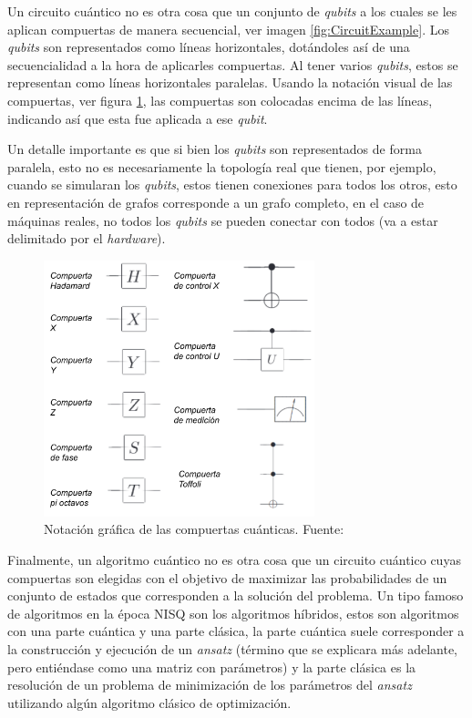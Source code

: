 Un circuito cuántico no es otra cosa que un conjunto de \textit{qubits} a los cuales se les aplican compuertas de manera secuencial, ver imagen \ref{fig:CircuitExample}. Los \textit{qubits} son representados como líneas horizontales, dotándoles así de una secuencialidad a la hora de aplicarles compuertas. Al tener varios \textit{qubits}, estos se representan como líneas horizontales paralelas. Usando la notación visual de las compuertas, ver figura \ref{fig:GatesGraphical}, las compuertas son colocadas encima de las líneas, indicando así que esta fue aplicada a ese \textit{qubit}.

Un detalle importante es que si bien los \textit{qubits} son representados de forma paralela, esto no es necesariamente la topología real que tienen, por ejemplo, cuando se simularan los \textit{qubits}, estos tienen conexiones para todos los otros, esto en representación de grafos corresponde a un grafo completo, en el caso de máquinas reales, no todos los \textit{qubits} se pueden conectar con todos (va a estar delimitado por el \textit{hardware}).

\begin{figure}[H]
\centering
\includegraphics[width=0.7\textwidth]{figures/S2/COMPUERTASVISUAL.png}
\caption{\label{fig:GatesGraphical} Notación gráfica de las compuertas cuánticas. Fuente: \cite{nielsen_chuang_2010}}
\end{figure}

Finalmente, un algoritmo cuántico no es otra cosa que un circuito cuántico cuyas compuertas son elegidas con el objetivo de maximizar las probabilidades de un conjunto de estados que corresponden a la solución del problema. Un tipo famoso de algoritmos en la época NISQ son los algoritmos híbridos, estos son algoritmos con una parte cuántica y una parte clásica, la parte cuántica suele corresponder a la construcción y ejecución de un \textit{ansatz} (término que se explicara más adelante, pero entiéndase como una matriz con parámetros) y la parte clásica es la resolución de un problema de minimización de los parámetros del \textit{ansatz} utilizando algún algoritmo clásico de optimización.

